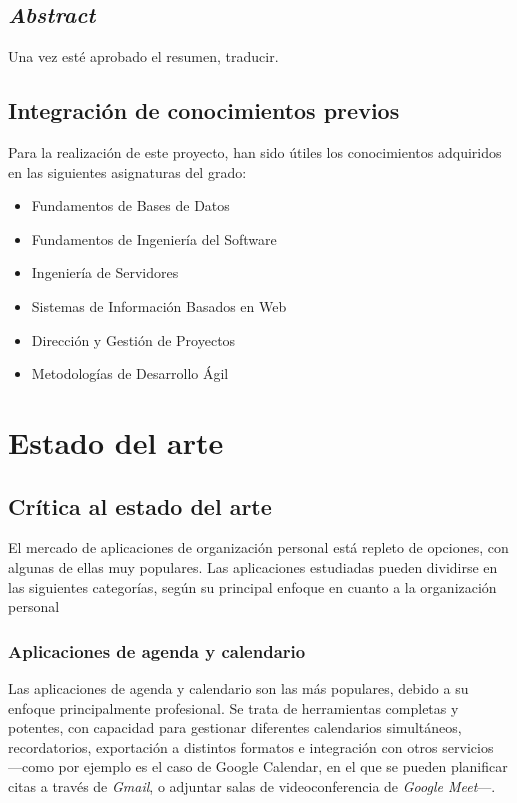 \documentclass[10pt, a4paper]{aqademic}
\begin{document}
\newpage


\section{\textit{Abstract}}

Una vez esté aprobado el resumen, traducir.


\newpage

\section{Integración de conocimientos previos}

Para la realización de este proyecto, han sido útiles los conocimientos adquiridos en las siguientes asignaturas del grado:

\begin{itemize}
	\item Fundamentos de Bases de Datos
	\item Fundamentos de Ingeniería del Software
	\item Ingeniería de Servidores
	\item Sistemas de Información Basados en Web
	\item Dirección y Gestión de Proyectos
	\item Metodologías de Desarrollo Ágil
\end{itemize}

\chapter{Estado del arte}

\section{Crítica al estado del arte}

El mercado de aplicaciones de organización personal está repleto de opciones, con algunas de ellas muy populares. Las aplicaciones estudiadas pueden dividirse en las siguientes categorías, según su principal enfoque en cuanto a la organización personal

\subsection*{Aplicaciones de agenda y calendario}

Las aplicaciones de agenda y calendario son las más populares, debido a su enfoque principalmente profesional. Se trata de herramientas completas y potentes, con capacidad para gestionar diferentes calendarios simultáneos, recordatorios, exportación a distintos formatos e integración con otros servicios ---como por ejemplo es el caso de Google Calendar, en el que se pueden planificar citas a través de \textit{Gmail}, o adjuntar salas de videoconferencia de \textit{Google Meet}---. 
\end{document}
